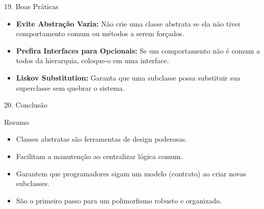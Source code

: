 \documentclass[9pt]{beamer}
\begin{document}
\begin{frame}{19. Boas Práticas}
    \begin{itemize}
        \item \textbf{Evite Abstração Vazia:} Não crie uma classe abstrata se ela não tiver comportamento comum ou métodos a serem forçados.
        \item \textbf{Prefira Interfaces para Opcionais:} Se um comportamento não é comum a todos da hierarquia, coloque-o em uma interface.
        \item \textbf{Liskov Substitution:} Garanta que uma subclasse possa substituir sua superclasse sem quebrar o sistema.
    \end{itemize}
\end{frame}

\begin{frame}{20. Conclusão}
    \begin{block}{Resumo}
        \begin{itemize}
            \item Classes abstratas são ferramentas de design poderosas.
            \item Facilitam a manutenção ao centralizar lógica comum.
            \item Garantem que programadores sigam um modelo (contrato) ao criar novas subclasses.
            \item São o primeiro passo para um polimorfismo robusto e organizado.
        \end{itemize}
    \end{block}
\end{frame}
\end{document}
